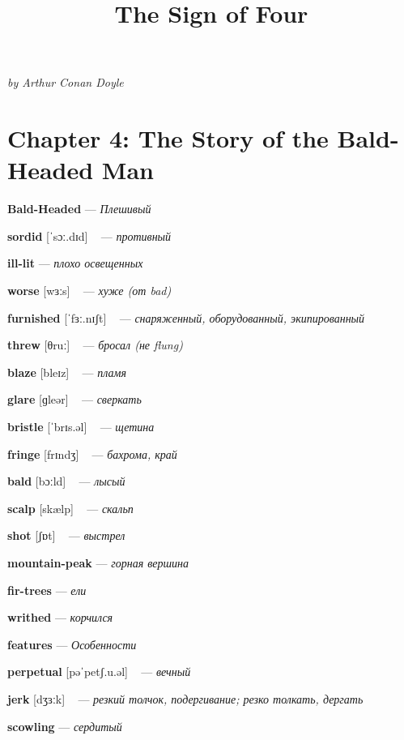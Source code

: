 \documentclass[a4paper,oneside,12pt]{amsart}
\begin{document}
\setcounter{secnumdepth}{0}
\vspace{-9mm}
\title{The Sign of Four} \maketitle
\vspace{-2mm}

\begin{center}
\emph{by Arthur Conan Doyle}
\end{center}
\section{Chapter 4: The Story of the Bald-Headed Man}

{\large 

 {\bf Bald-Headed } --- \emph{ Плешивый }

{\bf sordid } [ˈsɔː.dɪd] ~ --- \emph{ противный }

{\bf ill-lit } --- \emph{ плохо освещенных }

{\bf worse } [wɜːs] ~ --- \emph{ хуже (от bad) }

{\bf furnished } [ˈfɜː.nɪʃt] ~ --- \emph{ снаряженный, оборудованный, экипированный }

{\bf threw } [θruː] ~ --- \emph{ бросал (не flung) }

{\bf blaze } [bleɪz] ~ --- \emph{ пламя }

{\bf glare } [ɡleər] ~ --- \emph{ сверкать }

{\bf bristle } [ˈbrɪs.əl] ~ --- \emph{ щетина }

{\bf fringe } [frɪndʒ] ~ --- \emph{ бахрома, край }

{\bf bald } [bɔːld] ~ --- \emph{ лысый }

{\bf scalp } [skælp] ~ --- \emph{ скальп }

{\bf shot } [ʃɒt] ~ --- \emph{ выстрел }

{\bf mountain-peak } --- \emph{ горная вершина }

{\bf fir-trees } --- \emph{ ели }

{\bf writhed } --- \emph{ корчился }

{\bf features } --- \emph{ Особенности }

{\bf perpetual } [pəˈpetʃ.u.əl] ~ --- \emph{ вечный }

{\bf jerk } [dʒɜːk] ~ --- \emph{ резкий толчок, подергивание; резко толкать, дергать }

{\bf scowling } --- \emph{ сердитый }

}
\end{document}
